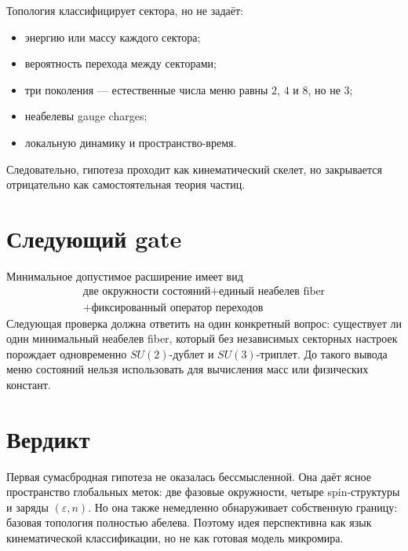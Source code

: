 \documentclass[12pt,a4paper]{article}
\begin{document}
Топология классифицирует сектора, но не задаёт:
\begin{itemize}
    \item энергию или массу каждого сектора;
    \item вероятность перехода между секторами;
    \item три поколения --- естественные числа меню равны \(2\), \(4\) и \(8\), но не \(3\);
    \item неабелевы gauge charges;
    \item локальную динамику и пространство-время.
\end{itemize}

Следовательно, гипотеза проходит как кинематический скелет, но закрывается отрицательно как самостоятельная теория частиц.

\section{Следующий gate}

Минимальное допустимое расширение имеет вид
\[
\begin{gathered}
\text{две окружности состояний}
+\text{единый неабелев fiber}
\\
+\text{фиксированный оператор переходов}
\end{gathered}
\]
Следующая проверка должна ответить на один конкретный вопрос: существует ли один минимальный неабелев fiber, который без независимых секторных настроек порождает одновременно \(SU(2)\)-дублет и \(SU(3)\)-триплет. До такого вывода меню состояний нельзя использовать для вычисления масс или физических констант.

\section{Вердикт}

Первая сумасбродная гипотеза не оказалась бессмысленной. Она даёт ясное пространство глобальных меток: две фазовые окружности, четыре spin-структуры и заряды \((\varepsilon,n)\). Но она также немедленно обнаруживает собственную границу: базовая топология полностью абелева. Поэтому идея перспективна как язык кинематической классификации, но не как готовая модель микромира.
\end{document}
